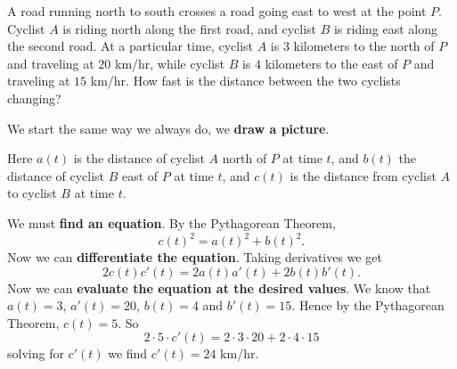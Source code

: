 \documentclass{ximera}
\begin{document}
\begin{example}
A road running north to south crosses a road going east to west at the
point $P$.  Cyclist $A$ is riding north along the first road, and cyclist $B$ is
riding east along the second road.  At a particular time, cyclist $A$ is $3$
kilometers to the north of $P$ and traveling at $20$ km/hr, while cyclist
$B$ is $4$ kilometers to the east of $P$ and traveling at $15$ km/hr.
How fast is the distance between the two cyclists changing?


\begin{explanation}
We start the same way we always do, we \textbf{draw a picture}.
\begin{image}
\end{image}
Here $a(t)$ is the distance of cyclist $A$ north of $P$ at time $t$,
and $b(t)$ the distance of cyclist $B$ east of $P$ at time $t$, and
$c(t)$ is the distance from cyclist $A$ to cyclist $B$ at time $t$.

We must \textbf{find an equation}.  By the Pythagorean Theorem,
\[
c(t)^2=a(t)^2+b(t)^2.
\] 
Now we can \textbf{differentiate the equation}. Taking derivatives we get 
\[
2c(t)c'(t)=2a(t)a'(t)+2b(t)b'(t).
\]
Now we can  \textbf{evaluate the equation at the desired values}.
We know that $a(t) = 3$, $a'(t) = 20$, $b(t) = 4$ and $b'(t) = 15$. Hence 
by the Pythagorean Theorem, $c(t) = 5$. So 
\[
2\cdot 5 \cdot c'(t) = 2 \cdot 3\cdot 20 + 2 \cdot 4 \cdot 15
\]
solving for $c'(t)$ we find $c'(t) = 24$ km/hr.
\end{explanation}
\end{example}
\end{document}
